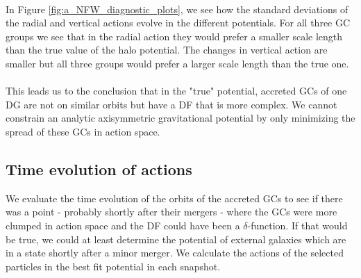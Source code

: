 \begin{figure}[ht]
\end{figure}
\\In Figure \ref{fig:a_NFW_diagnostic_plots}, we see how the standard deviations of the radial and vertical actions evolve in the different potentials. For all three \ac{GC} groups we see that in the radial action they would prefer a smaller scale length than the true value of the halo potential. The changes in vertical action are smaller but all three groups would prefer a larger scale length than the true one. 
\\\\This leads us to the conclusion that in the "true" potential, accreted \acp{GC} of one \ac{DG} are not on similar orbits but have a \ac{DF} that is more complex. We cannot constrain an analytic axisymmetric gravitational potential by only minimizing the spread of these \acp{GC} in action space.

\subsection{Time evolution of actions}\label{subsec:time_evo_actions}
We evaluate the time evolution of the orbits of the accreted \acp{GC} to see if there was a point - probably shortly after their mergers - where the \acp{GC} were more clumped in action space and the \ac{DF} could have been a $\delta$-function. If that would be true, we could at least determine the potential of external galaxies which are in a state shortly after a minor merger. We calculate the actions of the selected particles in the best fit potential in each snapshot.  

